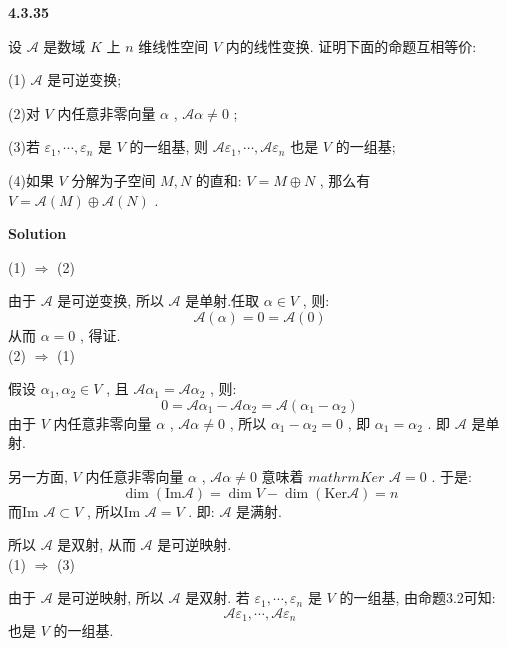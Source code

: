\documentclass[11pt,a4paper,openany,oneside]{book}
\newcommand\Solution{\noindent\textbf{\textsf{Solution}}\par\medskip}
\begin{document}
\begin{myexample}
	\textbf{4.3.35}

设 $ \mathcal{A} $ 是数域 $ K $ 上 $ n $ 维线性空间 $ V $ 内的线性变换. 证明下面的命题互相等价:

(1) $ \mathcal{A} $ 是可逆变换; 

(2)对 $ V $ 内任意非零向量 $ \alpha $ ,  $ \mathcal{A}\alpha \neq 0 $ ;

(3)若 $ \varepsilon_1, \cdots, \varepsilon_n $ 是 $ V $ 的一组基, 则 $ \mathcal{A}\varepsilon_1, \cdots, \mathcal{A}\varepsilon_n $ 也是 $ V $ 的一组基; 

(4)如果 $ V $ 分解为子空间 $ M,N $ 的直和:  $ V = M \oplus  N $ , 那么有 $ V = \mathcal{A}(M) \oplus  \mathcal{A}(N) $ . \\

\end{myexample}
\Solution


(1)  $ \Longrightarrow $  (2)

由于 $ \mathcal{A} $ 是可逆变换, 所以 $ \mathcal{A} $ 是单射.任取 $ \alpha \in V $ , 则:
 $$  \mathcal{A}(\alpha) = 0 = \mathcal{A}(0)  $$ 
从而 $ \alpha=0 $ , 得证. \\

(2)   $ \Longrightarrow $  (1) 

假设 $ \alpha_1, \alpha_2 \in V $ , 且 $ \mathcal{A}\alpha_1 = \mathcal{A}\alpha_2 $ , 则:
 $$  0 = \mathcal{A}\alpha_1 - \mathcal{A}\alpha_2 = \mathcal{A}(\alpha_1 - \alpha_2)  $$ 
由于 $ V $ 内任意非零向量 $ \alpha $ ,  $ \mathcal{A}\alpha \neq 0 $ , 所以 $ \alpha_1 - \alpha_2 =0 $ , 即 $ \alpha_1 = \alpha_2 $ . 即 $ \mathcal{A} $ 是单射.

另一方面,  $ V $ 内任意非零向量 $ \alpha $ ,  $ \mathcal{A}\alpha \neq 0 $ 意味着 $mathrm{Ker}$  $ \mathcal{A}=0 $ . 于是:
 $$  \dim ( \mathrm{Im} \mathcal{A}) = \dim V - \dim ( \mathrm{Ker} \mathcal{A}) = n  $$ 
而Im $ \mathcal{A} \subset V $ , 所以Im $ \mathcal{A} = V $ . 即: $ \mathcal{A} $ 是满射.

所以 $ \mathcal{A} $ 是双射, 从而 $ \mathcal{A} $ 是可逆映射. \\

(1)  $ \Longrightarrow $  (3) 

由于 $ \mathcal{A} $ 是可逆映射, 所以 $ \mathcal{A} $ 是双射. 若 $ \varepsilon_1, \cdots, \varepsilon_n $ 是 $ V $ 的一组基, 由命题3.2可知:
 $$  \mathcal{A}\varepsilon_1, \cdots, \mathcal{A}\varepsilon_n   $$ 
也是 $ V $ 的一组基. \\ 
\end{document}
